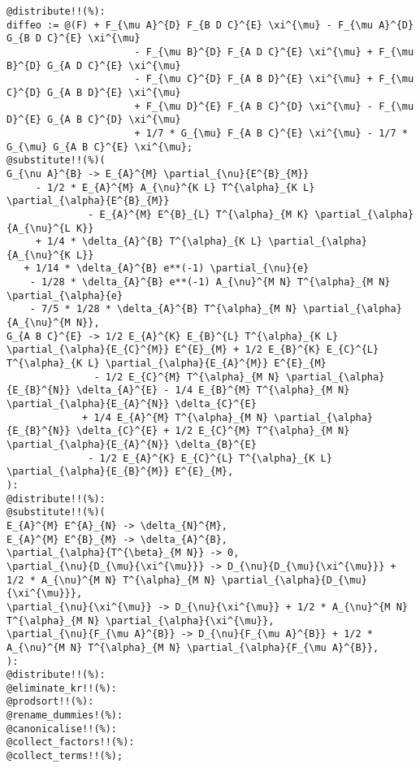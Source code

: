 \documentclass[11pt]{article}
\begin{document}
{\color[named]{Blue}\begin{verbatim}
@distribute!!(%):
diffeo := @(F) + F_{\mu A}^{D} F_{B D C}^{E} \xi^{\mu} - F_{\mu A}^{D} G_{B D C}^{E} \xi^{\mu}
                      - F_{\mu B}^{D} F_{A D C}^{E} \xi^{\mu} + F_{\mu B}^{D} G_{A D C}^{E} \xi^{\mu}
                      - F_{\mu C}^{D} F_{A B D}^{E} \xi^{\mu} + F_{\mu C}^{D} G_{A B D}^{E} \xi^{\mu}
                      + F_{\mu D}^{E} F_{A B C}^{D} \xi^{\mu} - F_{\mu D}^{E} G_{A B C}^{D} \xi^{\mu}
                      + 1/7 * G_{\mu} F_{A B C}^{E} \xi^{\mu} - 1/7 * G_{\mu} G_{A B C}^{E} \xi^{\mu};
@substitute!!(%)(
G_{\nu A}^{B} -> E_{A}^{M} \partial_{\nu}{E^{B}_{M}}
     - 1/2 * E_{A}^{M} A_{\nu}^{K L} T^{\alpha}_{K L} \partial_{\alpha}{E^{B}_{M}}
              - E_{A}^{M} E^{B}_{L} T^{\alpha}_{M K} \partial_{\alpha}{A_{\nu}^{L K}}
     + 1/4 * \delta_{A}^{B} T^{\alpha}_{K L} \partial_{\alpha}{A_{\nu}^{K L}}
   + 1/14 * \delta_{A}^{B} e**(-1) \partial_{\nu}{e}
    - 1/28 * \delta_{A}^{B} e**(-1) A_{\nu}^{M N} T^{\alpha}_{M N} \partial_{\alpha}{e}
    - 7/5 * 1/28 * \delta_{A}^{B} T^{\alpha}_{M N} \partial_{\alpha}{A_{\nu}^{M N}},
G_{A B C}^{E} -> 1/2 E_{A}^{K} E_{B}^{L} T^{\alpha}_{K L} \partial_{\alpha}{E_{C}^{M}} E^{E}_{M} + 1/2 E_{B}^{K} E_{C}^{L} T^{\alpha}_{K L} \partial_{\alpha}{E_{A}^{M}} E^{E}_{M}
               - 1/2 E_{C}^{M} T^{\alpha}_{M N} \partial_{\alpha}{E_{B}^{N}} \delta_{A}^{E} - 1/4 E_{B}^{M} T^{\alpha}_{M N} \partial_{\alpha}{E_{A}^{N}} \delta_{C}^{E}
             + 1/4 E_{A}^{M} T^{\alpha}_{M N} \partial_{\alpha}{E_{B}^{N}} \delta_{C}^{E} + 1/2 E_{C}^{M} T^{\alpha}_{M N} \partial_{\alpha}{E_{A}^{N}} \delta_{B}^{E}
              - 1/2 E_{A}^{K} E_{C}^{L} T^{\alpha}_{K L} \partial_{\alpha}{E_{B}^{M}} E^{E}_{M},
):
@distribute!!(%):
@substitute!!(%)(
E_{A}^{M} E^{A}_{N} -> \delta_{N}^{M},
E_{A}^{M} E^{B}_{M} -> \delta_{A}^{B},
\partial_{\alpha}{T^{\beta}_{M N}} -> 0,
\partial_{\nu}{D_{\mu}{\xi^{\mu}}} -> D_{\nu}{D_{\mu}{\xi^{\mu}}} + 1/2 * A_{\nu}^{M N} T^{\alpha}_{M N} \partial_{\alpha}{D_{\mu}{\xi^{\mu}}},
\partial_{\nu}{\xi^{\mu}} -> D_{\nu}{\xi^{\mu}} + 1/2 * A_{\nu}^{M N} T^{\alpha}_{M N} \partial_{\alpha}{\xi^{\mu}},
\partial_{\nu}{F_{\mu A}^{B}} -> D_{\nu}{F_{\mu A}^{B}} + 1/2 * A_{\nu}^{M N} T^{\alpha}_{M N} \partial_{\alpha}{F_{\mu A}^{B}},
):
@distribute!!(%):
@eliminate_kr!!(%):
@prodsort!!(%):
@rename_dummies!(%):
@canonicalise!!(%):
@collect_factors!!(%):
@collect_terms!!(%);
\end{verbatim}}
\end{document}
